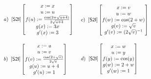 \documentclass[oneside,12pt]{article}
\begin{document}
\msk

$\scalebox{0.75}{$
  \begin{array}{l}
    \StwoIsetargs{ {x} {u} {3x} {3}
                    {\frac{\cos(2+\sqrt{3x+4})}{2\sqrt{3x+4}}·3}
                    {\frac{\cos(2+\sqrt{ u+4})}{2\sqrt{ u+4}}  } }
    a) \;\; \pfo{S2I} \StwoIsubsts
    \\[40pt]
    \StwoIsetargs{ {u} {v} {u+4} {1}
                    {\frac{\cos(2+\sqrt{u+4})}{2\sqrt{u+4}}·1}
                    {\frac{\cos(2+\sqrt{ v })}{2\sqrt{ v }}} }
    b) \;\; \pfo{S2I} \StwoIsubsts
  \end{array}
  $}
$
%
\qquad
%
$\scalebox{0.75}{$
  \begin{array}{l}
    \StwoIsetargs{ {v} {w} {\sqrt{v}} {(2\sqrt{v})^{-1}}
                    {\cos(2+\sqrt{v}) ·(2\sqrt{v})^{-1}}
                    {\cos(2+w)} }
    c) \;\; \pfo{S2I} \StwoIsubsts
    \\[40pt]
    \StwoIsetargs{ {w} {y} {2+w} {1}
                    {\cos(2+w)·1}
                    {\cos(y)} }
    d) \;\; \pfo{S2I} \StwoIsubsts
    \\
  \end{array}
  $}
$






\end{document}
